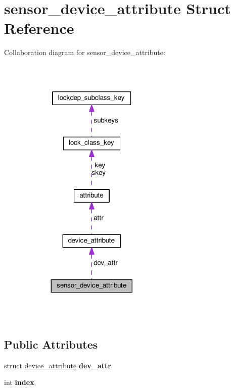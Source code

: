 \hypertarget{structsensor__device__attribute}{}\section{sensor\+\_\+device\+\_\+attribute Struct Reference}
\label{structsensor__device__attribute}


Collaboration diagram for sensor\+\_\+device\+\_\+attribute\+:
\nopagebreak
\begin{figure}[H]
\begin{center}
\leavevmode
\includegraphics[width=200pt]{structsensor__device__attribute__coll__graph}
\end{center}
\end{figure}
\subsection*{Public Attributes}
\begin{DoxyCompactItemize}
\item 
\hypertarget{structsensor__device__attribute_a986579cac9da3b3a6afc54d60ca1e508}{}struct \hyperlink{structdevice__attribute}{device\+\_\+attribute} {\bfseries dev\+\_\+attr}\label{structsensor__device__attribute_a986579cac9da3b3a6afc54d60ca1e508}

\item 
\hypertarget{structsensor__device__attribute_a3060568d704dda30cc9938d71b3691be}{}int {\bfseries index}\label{structsensor__device__attribute_a3060568d704dda30cc9938d71b3691be}

\end{DoxyCompactItemize}


